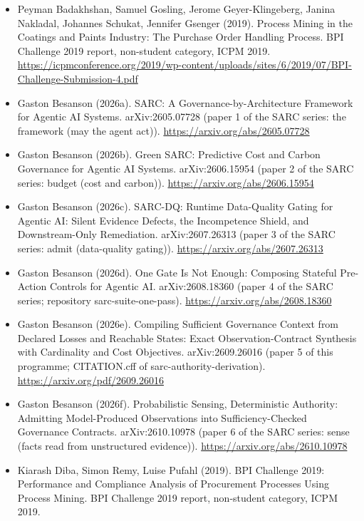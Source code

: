 \documentclass[
  10pt,
]{article}
\begin{document}
\begin{itemize}
\item
  Peyman Badakhshan, Samuel Gosling, Jerome Geyer-Klingeberg, Janina
  Nakladal, Johannes Schukat, Jennifer Gsenger (2019). Process Mining in
  the Coatings and Paints Industry: The Purchase Order Handling Process.
  BPI Challenge 2019 report, non-student category, ICPM 2019.
  \url{https://icpmconference.org/2019/wp-content/uploads/sites/6/2019/07/BPI-Challenge-Submission-4.pdf}
\item
  Gaston Besanson (2026a). SARC: A Governance-by-Architecture Framework
  for Agentic AI Systems. arXiv:2605.07728 (paper 1 of the SARC series:
  the framework (may the agent act)). \url{https://arxiv.org/abs/2605.07728}
\item
  Gaston Besanson (2026b). Green SARC: Predictive Cost and Carbon
  Governance for Agentic AI Systems. arXiv:2606.15954 (paper 2 of the
  SARC series: budget (cost and carbon)).
  \url{https://arxiv.org/abs/2606.15954}
\item
  Gaston Besanson (2026c). SARC-DQ: Runtime Data-Quality Gating for
  Agentic AI: Silent Evidence Defects, the Incompetence Shield, and
  Downstream-Only Remediation. arXiv:2607.26313 (paper 3 of the SARC
  series: admit (data-quality gating)). \url{https://arxiv.org/abs/2607.26313}
\item
  Gaston Besanson (2026d). One Gate Is Not Enough: Composing Stateful
  Pre-Action Controls for Agentic AI. arXiv:2608.18360 (paper 4 of the
  SARC series; repository sarc-suite-one-pass).
  \url{https://arxiv.org/abs/2608.18360}
\item
  Gaston Besanson (2026e). Compiling Sufficient Governance Context from
  Declared Losses and Reachable States: Exact Observation-Contract
  Synthesis with Cardinality and Cost Objectives. arXiv:2609.26016
  (paper 5 of this programme; CITATION.cff of
  sarc-authority-derivation). \url{https://arxiv.org/pdf/2609.26016}
\item
  Gaston Besanson (2026f). Probabilistic Sensing, Deterministic
  Authority: Admitting Model-Produced Observations into
  Sufficiency-Checked Governance Contracts. arXiv:2610.10978 (paper 6 of
  the SARC series: sense (facts read from unstructured evidence)).
  \url{https://arxiv.org/abs/2610.10978}
\item
  Kiarash Diba, Simon Remy, Luise Pufahl (2019). BPI Challenge 2019:
  Performance and Compliance Analysis of Procurement Processes Using
  Process Mining. BPI Challenge 2019 report, non-student category, ICPM
  2019.

\end{itemize}
\end{document}
